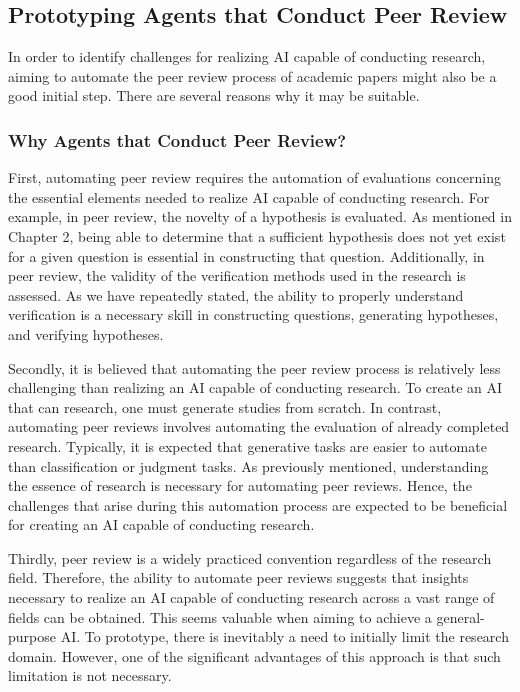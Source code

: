 \subsection{Prototyping Agents that Conduct Peer Review}
In order to identify challenges for realizing AI capable of conducting research, aiming to automate the peer review process of academic papers might also be a good initial step. There are several reasons why it may be suitable.

\subsubsection{Why Agents that Conduct Peer Review?}

First, automating peer review requires the automation of evaluations concerning the essential elements needed to realize AI capable of conducting research. For example, in peer review, the novelty of a hypothesis is evaluated. As mentioned in Chapter 2, being able to determine that a sufficient hypothesis does not yet exist for a given question is essential in constructing that question. Additionally, in peer review, the validity of the verification methods used in the research is assessed. As we have repeatedly stated, the ability to properly understand verification is a necessary skill in constructing questions, generating hypotheses, and verifying hypotheses.

Secondly, it is believed that automating the peer review process is relatively less challenging than realizing an AI capable of conducting research. To create an AI that can research, one must generate studies from scratch. In contrast, automating peer reviews involves automating the evaluation of already completed research. Typically, it is expected that generative tasks are easier to automate than classification or judgment tasks. As previously mentioned, understanding the essence of research is necessary for automating peer reviews. Hence, the challenges that arise during this automation process are expected to be beneficial for creating an AI capable of conducting research.

Thirdly, peer review is a widely practiced convention regardless of the research field. Therefore, the ability to automate peer reviews suggests that insights necessary to realize an AI capable of conducting research across a vast range of fields can be obtained. This seems valuable when aiming to achieve a general-purpose AI. To prototype, there is inevitably a need to initially limit the research domain. However, one of the significant advantages of this approach is that such limitation is not necessary.

